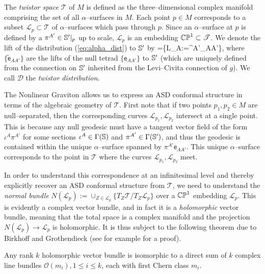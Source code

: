 The \textit{twistor space} $\mathscr{T}$ of $M$ is defined as the three--dimensional complex manifold comprising the set of all $\alpha$--surfaces in $M$. Each point $p\in M$ corresponds to a subset $\mathscr{L}_p\subset\mathscr{T}$ of $\alpha$--surfaces which pass through $p$. Since an $\alpha$--surface at $p$ is defined by a $\pi^{A'}\in\mathbb{S}'|_p$ up to scale, $\mathscr{L}_p$ is an embedding $\mathbb{CP}^1\subset\mathscr{T}$. We denote the lift of the distribution (\ref{eq:alpha_dist}) to $\mathbb{S}'$ by
\be \label{eq:twistor_dist}
=\{L_A:=\pi^{A'}_{AA'}\},
\ee
where $\{\tilde{\mathsf{e}}_{AA'}\}$ are the lifts of the null tetrad $\{\mathsf{e}_{AA'}\}$ to $\mathbb{S}'$ (which are uniquely defined from the connection on $\mathbb{S}'$ inherited from the Levi--Civita connection of $g$). We call $\mathcal{D}$ the \textit{twistor distribution}.

The Nonlinear Graviton allows us to express an ASD conformal structure in terms of the algebraic geometry of $\mathscr{T}$. First note that if two points $p_1,p_2\in M$ are null--separated, then the corresponding curves $\mathscr{L}_{p_1},\mathscr{L}_{p_2}$ intersect at a single point. This is because any null geodesic must have a tangent vector field of the form $\iota^A\pi^{A'}$ for some sections $\iota^A\in\Gamma(\mathbb{S})$ and $\pi^{A'}\in\Gamma(\mathbb{S}')$, and thus the geodesic is contained within the unique $\alpha$--surface spanned by $\pi^{A'}\mathsf{e}_{AA'}$. This unique $\alpha$--surface corresponds to the point in $\mathscr{T}$ where the curves $\mathscr{L}_{p_1},\mathscr{L}_{p_2}$ meet.

In order to understand this correspondence at an infinitesimal level and thereby explicitly recover an ASD conformal structure from $\mathscr{T}$, we need to understand the \textit{normal bundle} $N(\mathscr{L}_p):=\cup_{Z\in \mathscr{L}_p}\{T_Z\mathscr{T}/T_Z\mathscr{L}_p\}$ over a $\mathbb{CP}^1$ embedding $\mathscr{L}_p$. This is evidently a complex vector bundle, and in fact it is a \textit{holomorphic} vector bundle, meaning that the total space is a complex manifold and the projection $N(\mathscr{L}_p)\rightarrow\mathscr{L}_p$ is holomorphic. It is thus subject to the following theorem due to Birkhoff and Grothendieck (see for example \cite{complex_mfds} for a proof).
\begin{theo}
Any rank $k$ holomorphic vector bundle is isomorphic to a direct sum of $k$ complex line bundles $\mathcal{O}(m_i),1\leq i\leq k$, each with first Chern class $m_i$. 
\end{theo}

